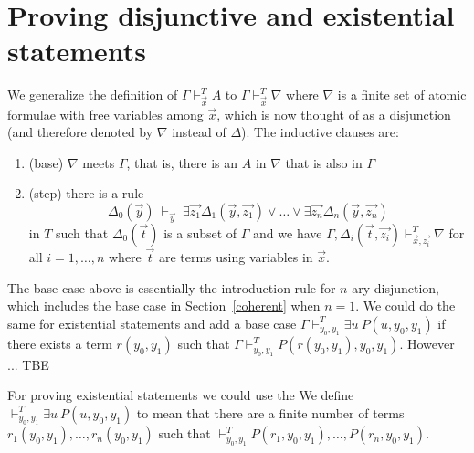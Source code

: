 \documentclass[10pt,a4paper]{article}
\begin{document}
\section{Proving disjunctive and existential statements}

 We generalize the definition of $\Gamma\vdash_{\vec{x}}^T A$ to 
$\Gamma\vdash_{\vec{x}}^T \nabla$ where $\nabla$ is a finite set of atomic formulae with
free variables among $\vec{x}$, which is now thought of as a disjunction
(and therefore denoted by $\nabla$ instead of $\Delta$). 
The inductive clauses are:

\begin{enumerate}
\item (base) $\nabla$ meets $\Gamma$, that is, there is an $A$ in $\nabla$ that is 
also in $\Gamma$

\item (step) there is a rule
$$
\Delta_0(\vec{y})~\vdash_{\vec{y}}~
\exists \vec{z_1}\Delta_1(\vec{y},\vec{z_1})\vee\dots\vee\exists \vec{z_n}\Delta_n(\vec{y},\vec{z_n})
$$
in $T$ such that $\Delta_0(\vec{t})$ is a subset of $\Gamma$ and
we have $\Gamma,\Delta_i(\vec{t},\vec{z_i})\vdash^T_{\vec{x},\vec{z_i}} \nabla$ for all $i = 1,\dots,n$
where $\vec{t}$ are terms using variables in $\vec{x}$.
\end{enumerate}

The base case above is essentially the introduction rule for $n$-ary disjunction,
which includes the base case in Section~\ref{coherent} when $n=1$.
We could do the same for existential statements and add a base case
$\Gamma\vdash_{y_0,y_1}^T \exists u~P(u,y_0,y_1)$ if there exists a term $r(y_0,y_1)$
such that $\Gamma\vdash_{y_0,y_1}^T P(r(y_0,y_1),y_0,y_1)$.
However ... TBE

For proving existential statements we could use the 
 We define $\vdash_{y_0,y_1}^T \exists u~P(u,y_0,y_1)$ to mean that there are a finite number
of terms $r_1(y_0,y_1),\dots,r_n(y_0,y_1)$ such that
$\vdash_{y_0,y_1}^T P(r_1,y_0,y_1),\dots,P(r_n,
y_0,y_1)$.

\end{document}
